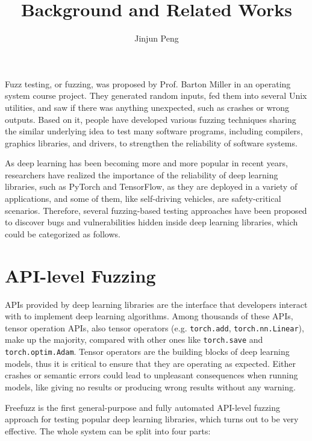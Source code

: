 \documentclass{article}
\begin{document}


\title{Background and Related Works}
\author{Jinjun Peng}
\maketitle

Fuzz testing, or fuzzing, was proposed by Prof. Barton Miller in an operating system course project. They generated random inputs, fed them into several Unix utilities, and saw if there was anything unexpected, such as crashes or wrong outputs. Based on it, people have developed various fuzzing techniques sharing the similar underlying idea to test many software programs, including compilers, graphics libraries, and drivers, to strengthen the reliability of software systems.

As deep learning has been becoming more and more popular in recent years, researchers have realized the importance of the reliability of deep learning libraries, such as PyTorch and TensorFlow, as they are deployed in a variety of applications, and some of them, like self-driving vehicles, are safety-critical scenarios. Therefore, several fuzzing-based testing approaches have been proposed to discover bugs and vulnerabilities hidden inside deep learning libraries, which could be categorized as follows.

\section{API-level Fuzzing}

APIs provided by deep learning libraries are the interface that developers interact with to implement deep learning algorithms. Among thousands of these APIs, tensor operation APIs, also tensor operators (e.g. \texttt{torch.add}, \texttt{torch.nn.Linear}), make up the majority, compared with other ones like \texttt{torch.save} and \texttt{torch.optim.Adam}. Tensor operators are the building blocks of deep learning models, thus it is critical to ensure that they are operating as expected. Either crashes or semantic errors could lead to unpleasant consequences when running models, like giving no results or producing wrong results without any warning.

Freefuzz is the first general-purpose and fully automated API-level fuzzing approach for testing popular deep learning libraries, which turns out to be very effective. The whole system can be split into four parts:
\end{document}
